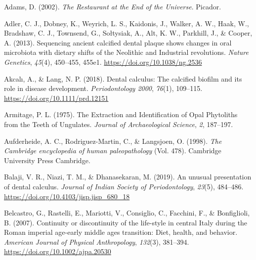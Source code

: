 \documentclass[
  b5paper,
]{book}
\newlength{\cslhangindent}
\newlength{\cslentryspacingunit} %
\newenvironment{CSLReferences}[2] %
 {%
  \setlength{\parindent}{0pt}
  \ifodd #1
  \let\oldpar\par
  \def\par{\hangindent=\cslhangindent\oldpar}
  \fi
  \setlength{\parskip}{#2\cslentryspacingunit}
 }%
 {}
\begin{document}

\hypertarget{refs-1}{}
\begin{CSLReferences}{1}{0}
\leavevmode{}%
Adams, D. (2002). \emph{The {Restaurant} at the {End} of the
{Universe}}. {Picador}.

\leavevmode{}%
Adler, C. J., Dobney, K., Weyrich, L. S., Kaidonis, J., Walker, A. W.,
Haak, W., Bradshaw, C. J., Townsend, G., Sołtysiak, A., Alt, K. W.,
Parkhill, J., \& Cooper, A. (2013). Sequencing ancient calcified dental
plaque shows changes in oral microbiota with dietary shifts of the
{Neolithic} and {Industrial} revolutions. \emph{Nature Genetics},
\emph{45}(4), 450--455, 455e1. \url{https://doi.org/10.1038/ng.2536}

\leavevmode{}%
Akcalı, A., \& Lang, N. P. (2018). Dental calculus: The calcified
biofilm and its role in disease development. \emph{Periodontology 2000},
\emph{76}(1), 109--115. \url{https://doi.org/10.1111/prd.12151}

\leavevmode{}%
Armitage, P. L. (1975). The {Extraction} and {Identification} of {Opal
Phytoliths} from the {Teeth} of {Ungulates}. \emph{Journal of
Archaeological Science}, \emph{2}, 187--197.

\leavevmode{}%
Aufderheide, A. C., Rodriguez-Martin, C., \& Langsjoen, O. (1998).
\emph{The {Cambridge} encyclopedia of human paleopathology} (Vol. 478).
{Cambridge University Press Cambridge}.

\leavevmode{}%
Balaji, V. R., Niazi, T. M., \& Dhanasekaran, M. (2019). An unusual
presentation of dental calculus. \emph{Journal of Indian Society of
Periodontology}, \emph{23}(5), 484--486.
\url{https://doi.org/10.4103/jisp.jisp_680_18}

\leavevmode{}%
Belcastro, G., Rastelli, E., Mariotti, V., Consiglio, C., Facchini, F.,
\& Bonfiglioli, B. (2007). Continuity or discontinuity of the life-style
in central {Italy} during the {Roman} imperial age-early middle ages
transition: {Diet}, health, and behavior. \emph{American Journal of
Physical Anthropology}, \emph{132}(3), 381--394.
\url{https://doi.org/10.1002/ajpa.20530}


\end{CSLReferences}
\end{document}
